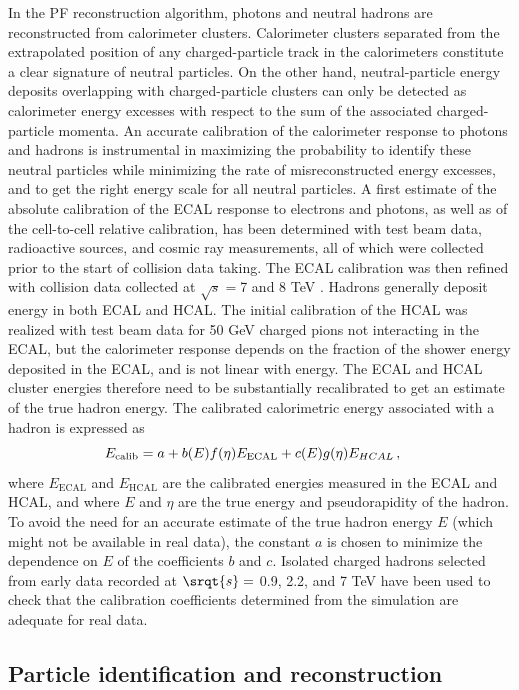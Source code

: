 In the PF reconstruction algorithm, photons and neutral hadrons are reconstructed from calorimeter clusters. Calorimeter clusters separated from the extrapolated position of any charged-particle track in the calorimeters constitute a clear signature of neutral particles.  On the other hand, neutral-particle energy deposits overlapping with charged-particle clusters can only be detected  as  calorimeter  energy  excesses  with  respect  to  the  sum  of  the  associated  charged-particle momenta. An accurate calibration of the calorimeter response to photons and hadrons is instrumental in maximizing the probability to identify these neutral particles while minimizing the rate of misreconstructed energy excesses, and to get the right energy scale for all neutral particles. A first estimate of the absolute calibration of the ECAL response to electrons and photons, as well as of the cell-to-cell relative calibration, has been determined with test beam data, radioactive sources,  and cosmic ray measurements,  all of which were collected prior to the start of collision data taking.  The ECAL calibration was then refined with collision data collected at $\sqrt{s}=$7 and 8 TeV \cite{2013}. Hadrons generally deposit energy in both ECAL and HCAL. The initial calibration of the HCAL was realized with test beam data for 50 GeV charged pions not interacting in the ECAL, but the calorimeter response depends on the fraction of the shower energy deposited in the ECAL, and is not linear with energy. The ECAL and HCAL cluster energies therefore need to be substantially recalibrated to get an estimate of the true hadron energy. The calibrated calorimetric energy associated with a hadron is expressed as
\begin{equation}
    E_{\mathrm{calib}} = a + b(E)f(\eta)E_{\mathrm{ECAL}} + c(E)g(\eta)E_{HCAL} \msep
\end{equation}
where $E_{\mathrm{ECAL}}$ and $E_{\mathrm{HCAL}}$ are the calibrated energies measured in the ECAL and HCAL, and where $E$ and $\eta$ are the true energy and pseudorapidity of the hadron. To avoid the need for an accurate estimate of the true hadron energy $E$ (which might not be available in real data),  the constant $a$ is chosen to minimize the dependence on $E$ of the coefficients $b$ and $c$. Isolated charged hadrons selected from early data recorded at $\srqt{s}=$ 0.9, 2.2, and 7 TeV have been used to check that the calibration coefficients determined from the simulation are adequate for real data.

\subsection{Particle identification and reconstruction}

